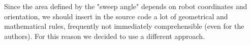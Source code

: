 %
Since the area defined by the "sweep angle" depends on robot coordinates and orientation, we should insert in
the source code a lot of geometrical and mathematical rules, frequently not immediately comprehensible
(even for the authors). For this reason we decided to use a different approach.
%

\begin{figure}[htp]
  \begin{center}
    \hspace*{15pt}


\end{center}
\end{figure}
